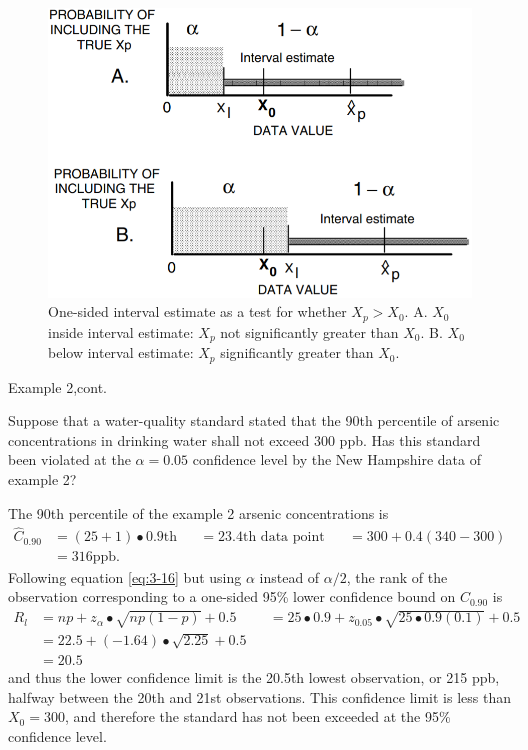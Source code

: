 \documentclass[]{book}
\begin{document}
\begin{figure}

{\centering \includegraphics[width=11.71in]{figures/3_10} 

}

\caption{One-sided interval estimate as a test for whether $X_{p} > X_{0}$.
A. $X_{0}$ inside interval estimate: $X_{p}$ not significantly greater than $X_{0}$.
B. $X_{0}$ below interval estimate: $X_{p}$ significantly greater than $X_{0}$.}\label{fig:fig-3-10}
\end{figure}

Example 2,cont.

Suppose that a water-quality standard stated that the 90th percentile of arsenic concentrations in drinking water shall not exceed 300 ppb. Has this standard been violated at the \(\alpha = 0.05\) confidence level by the New Hampshire data of example 2?

The 90th percentile of the example 2 arsenic concentrations is
\begin{equation}
\begin{aligned}
\hat{C}_{0.90} &= (25 + 1) \bullet 0.9\text{th} &&= 23.4\text{th data point} &&&= 300 + 0.4(340 − 300) \\
&= 316 \text{ppb.}
\end{aligned}
\end{equation}
Following equation \eqref{eq:3-16} but using \(\alpha\) instead of \(\alpha / 2\), the rank of the observation corresponding to a one-sided 95\% lower confidence bound on \(C_{0.90}\) is
\begin{equation}
\begin{aligned}
R_{l} &= np + z_{\alpha} \bullet \sqrt{np(1 - p)} + 0.5 &&= 25 \bullet 0.9 + z_{0.05} \bullet \sqrt{25 \bullet 0.9(0.1)} + 0.5 \\
&= 22.5 + (- 1.64) \bullet \sqrt{2.25} + 0.5 \\
&= 20.5
\end{aligned}
\end{equation}
and thus the lower confidence limit is the 20.5th lowest observation, or 215 ppb, halfway between the 20th and 21st observations. This confidence limit is less than \(X_{0} = 300\), and therefore the standard has not been exceeded at the 95\% confidence level.
\end{document}
